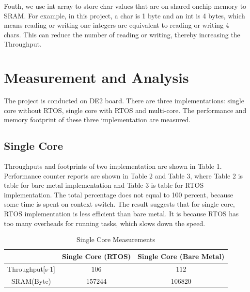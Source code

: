 \documentclass[conference,compsoc]{IEEEtran}
\begin{document}
  Fouth, we use int array to store char values that are on shared onchip memory to SRAM.
  For example, in this project, a char is 1 byte and an int is 4 bytes, which means reading or writing one
  integers are equivalent to reading or writing 4 chars. This can reduce the number of reading or writing, thereby increasing the 
  Throughput.


  
  \section{Measurement and Analysis}
  The project is conducted on DE2 board. There are three implementations: single core without RTOS, single core with RTOS and multi-core. The performance and memory footprint of these three implementation are measured. 
  \subsection{Single Core}
  Throughputs and footprints of two implementation are shown in Table 1. Performance counter reports are shown in Table 2 and Table 3, where Table 2 is table for bare metal implementation and Table 3 is table for RTOS implementation. The total percentage does not equal to 100 percent, because some time is spent on context switch. The result suggests that for single core, RTOS implementation is less efficient than bare metal. It is because RTOS has too many overheads for running tasks, which slows down the speed.  
  \begin{table}
  \centering
  \caption{Single Core Measurements}
  \begin{tabular}[t]{  ccc } 
  \hline
  \centering
  & Single Core (RTOS)& Single Core (Bare Metal)\\
  \hline
  Throughput[s-1]& 106 & 112 \\
  SRAM(Byte)& 157244 & 106820 \\
  \hline
  \end{tabular}
  \end{table}
  
\end{document}
